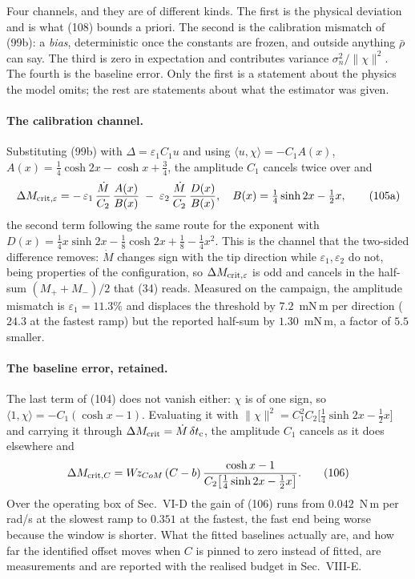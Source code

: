 \documentclass[10pt]{article}
\newcommand{\Wz}{W\!z_{CoM}}
\newcommand{\tc}{t_{\rm c}}
\newcommand{\rbar}{\bar\rho}
\begin{document}
Four channels, and they are of different kinds. The first is the
physical deviation and is what (108) bounds a priori. The second is the
calibration mismatch of (99b): a \emph{bias}, deterministic once the
constants are frozen, and outside anything $\rbar$ can say. The third
is zero in expectation and contributes variance
$\sigma_n^2/\|\chi\|^2$. The fourth is the baseline error. Only the
first is a statement about the physics the model omits; the rest are
statements about what the estimator was given.

\paragraph{The calibration channel.} Substituting (99b) with
$\Delta = \varepsilon_1C_1u$ and using $\langle u,\chi\rangle =
-C_1A(x)$, $A(x) = \tfrac14\cosh2x - \cosh x + \tfrac34$, the amplitude
$C_1$ cancels twice over and
\begin{equation}
  \Delta M_{{\rm crit},\varepsilon}
  = -\,\varepsilon_1\,\frac{\dot M}{C_2}\,\frac{A(x)}{B(x)}
    \;-\; \varepsilon_2\,\frac{\dot M}{C_2}\,\frac{D(x)}{B(x)} ,
  \quad B(x) = \tfrac14\sinh2x - \tfrac12x,
  \tag{105a}
\end{equation}
the second term following the same route for the exponent with
$D(x) = \tfrac14x\sinh2x - \tfrac18\cosh2x + \tfrac18 - \tfrac14x^2$.
This is the channel that the two-sided difference removes: $\dot M$
changes sign with the tip direction while $\varepsilon_1,\varepsilon_2$
do not, being properties of the configuration, so
$\Delta M_{{\rm crit},\varepsilon}$ is odd and cancels in the half-sum
$(M_+ + M_-)/2$ that (34) reads. Measured on the campaign, the amplitude
mismatch is $\varepsilon_1 = 11.3\%$ and displaces the threshold by
$7.2$~mN\,m per direction ($24.3$ at the fastest ramp) but the reported
half-sum by $1.30$~mN\,m, a factor of $5.5$ smaller.

\paragraph{The baseline error, retained.}
The last term of (104) does not vanish either: $\chi$ is of one sign, so
$\langle1,\chi\rangle = -C_1(\cosh x - 1)$. Evaluating it with
$\|\chi\|^2 = C_1^2C_2\bigl[\tfrac14\sinh 2x - \tfrac12 x\bigr]$ and
carrying it through $\Delta M_{\rm crit} = \dot M\,\delta\tc$, the
amplitude $C_1$ cancels as it does elsewhere and
\begin{equation}
  \Delta M_{{\rm crit},C}
  = \Wz\,(C - b)\,
    \frac{\cosh x - 1}
         {C_2\bigl[\tfrac14\sinh 2x - \tfrac12 x\bigr]} .
  \tag{106}
\end{equation}
Over the operating box of Sec.~VI-D the gain of (106) runs from
$0.042$~N\,m per rad/s at the slowest ramp to $0.351$ at the fastest,
the fast end being worse because the window is shorter. What the fitted
baselines actually are, and how far the identified offset moves when
$C$ is pinned to zero instead of fitted, are measurements and are
reported with the realised budget in Sec.~VIII-E.
\end{document}
